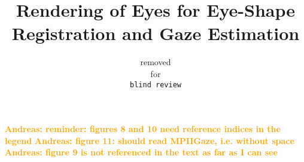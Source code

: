 \documentclass[10pt,twocolumn,letterpaper]{article}
\newcommand{\commentA}[1]{\textsf{\textbf{\textcolor{orange}{Andreas: #1}}}}
\begin{document}
\title{Rendering of Eyes for Eye-Shape Registration and Gaze Estimation}



\author{removed\\
for\\
{\tt\small blind review}
}

\maketitle

\begin{abstract}

\end{abstract}


\commentA{reminder: figures 8 and 10 need reference indices in the legend}
%
\commentA{figure 11: should read MPIIGaze, i.e. without space}
%
\commentA{figure 9 is not referenced in the text as far as I can see}








\clearpage

{\small


}
\end{document}
